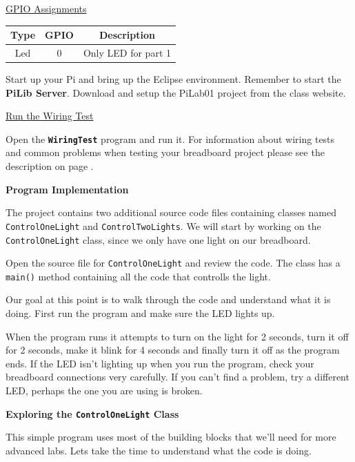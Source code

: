 \underline{GPIO Assignments}

\begin{center}
	\begin{tabular}{c | c | c}
		\hline
		\textbf{Type} & \textbf{GPIO} & \textbf{Description} \\ \hline
		Led & 0 & Only LED for part 1 \\ 
		\hline	
	\end{tabular}
\end{center}

\vspace{10pt}

Start up your Pi and bring up the Eclipse environment. 	Remember to start the \textbf{PiLib Server}. Download and setup the PiLab01 project from the class website.

\underline{Run the Wiring Test}

Open the \textbf{\texttt{WiringTest}} program and run it. For information about wiring tests and common problems when testing your breadboard project please see the description on page \pageref{wiringTestDescription}.

\textbf{Program Implementation}

The project contains two additional source code files containing classes named \texttt{ControlOneLight} and \texttt{ControlTwoLights}. We will start by working on the \texttt{ControlOneLight} class, since we only have one light on our breadboard.

Open the source file for \texttt{ControlOneLight} and review the code. The class has a \texttt{main()} method containing all the code that controlls the light.

Our goal at this point is to walk through the code and understand what it is doing. First run the program and make sure the LED lights up. 

When the program runs it attempts to turn on the light for 2 seconds, turn it off for 2 seconds, make it blink for 4 seconds and finally turn it off as the program ends. If the LED isn't lighting up when you run the program, check your breadboard connections very carefully. If you can't find a problem, try a different LED, perhaps the one you are using is broken.

\textbf{Exploring the \texttt{ControlOneLight} Class}

This simple program uses most of the building blocks that we'll need for more advanced labs. Lets take the time to understand what the code is doing.

